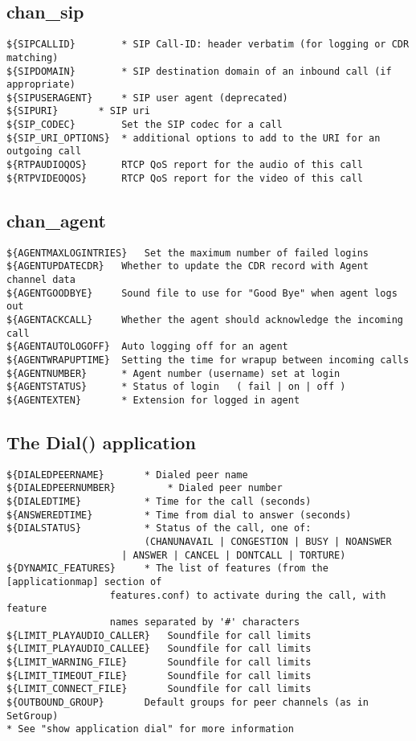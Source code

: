 \subsection{chan\_sip}
\begin{verbatim}
${SIPCALLID} 		* SIP Call-ID: header verbatim (for logging or CDR matching)
${SIPDOMAIN}    	* SIP destination domain of an inbound call (if appropriate)
${SIPUSERAGENT} 	* SIP user agent (deprecated)
${SIPURI}		* SIP uri
${SIP_CODEC} 		Set the SIP codec for a call	
${SIP_URI_OPTIONS}	* additional options to add to the URI for an outgoing call
${RTPAUDIOQOS}		RTCP QoS report for the audio of this call
${RTPVIDEOQOS}		RTCP QoS report for the video of this call
\end{verbatim}

\subsection{chan\_agent}
\begin{verbatim}
${AGENTMAXLOGINTRIES}	Set the maximum number of failed logins
${AGENTUPDATECDR}	Whether to update the CDR record with Agent channel data
${AGENTGOODBYE}		Sound file to use for "Good Bye" when agent logs out
${AGENTACKCALL} 	Whether the agent should acknowledge the incoming call
${AGENTAUTOLOGOFF}	Auto logging off for an agent
${AGENTWRAPUPTIME}	Setting the time for wrapup between incoming calls
${AGENTNUMBER}		* Agent number (username) set at login
${AGENTSTATUS}		* Status of login	( fail | on | off )
${AGENTEXTEN}		* Extension for logged in agent
\end{verbatim}


\subsection{The Dial() application}
\begin{verbatim}
${DIALEDPEERNAME} 		* Dialed peer name
${DIALEDPEERNUMBER} 		* Dialed peer number
${DIALEDTIME}   		* Time for the call (seconds)
${ANSWEREDTIME} 		* Time from dial to answer (seconds)
${DIALSTATUS}   		* Status of the call, one of:
                		(CHANUNAVAIL | CONGESTION | BUSY | NOANSWER 
					| ANSWER | CANCEL | DONTCALL | TORTURE)
${DYNAMIC_FEATURES}		* The list of features (from the [applicationmap] section of
				  features.conf) to activate during the call, with feature
				  names separated by '#' characters
${LIMIT_PLAYAUDIO_CALLER}	Soundfile for call limits
${LIMIT_PLAYAUDIO_CALLEE}	Soundfile for call limits
${LIMIT_WARNING_FILE}		Soundfile for call limits
${LIMIT_TIMEOUT_FILE}		Soundfile for call limits
${LIMIT_CONNECT_FILE}		Soundfile for call limits
${OUTBOUND_GROUP}		Default groups for peer channels (as in SetGroup)
* See "show application dial" for more information
\end{verbatim}


